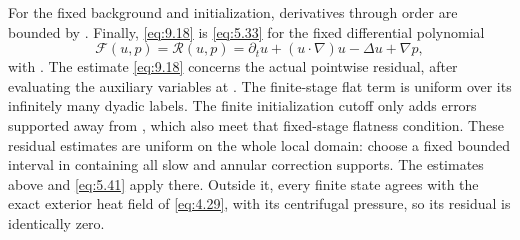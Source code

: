 %
For the fixed background and initialization, derivatives through order
 are bounded by
. Finally, \eqref{eq:9.18} is
\eqref{eq:5.33} for the fixed differential polynomial
\[
\mathcal F(u,p)=\mathscr R(u,p)=\partial_tu+(u\mathbin{\cdot}\nabla)u-\Delta u+\nabla p,
\]
with . The estimate \eqref{eq:9.18}
concerns the actual pointwise residual, after evaluating the auxiliary variables at
. The finite-stage flat term is uniform over its infinitely many
dyadic labels. The finite initialization cutoff only adds errors supported away from
, which also meet that fixed-stage flatness condition. These residual
estimates are uniform on the whole local domain: choose a fixed bounded interval in
 containing all slow and annular correction supports. The estimates above
and \eqref{eq:5.41} apply there. Outside it, every finite state agrees with the exact exterior heat
field of \eqref{eq:4.29}, with its centrifugal pressure, so its residual is identically zero.

